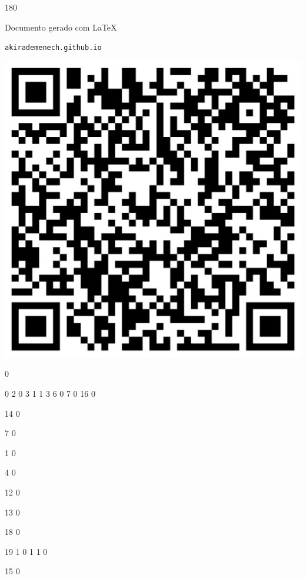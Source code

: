 \documentclass[12pt]{article}
\begin{document}
	\begin{turn}{180}	
		\begin{minipage}{\textwidth}		  
		  Documento gerado com \LaTeX			
		  
		  \texttt{akirademenech.github.io}

		  \includegraphics[height=0.3\textheight]{2e-2.pdf}

		\end{minipage}	
	\end{turn}  
		  
		\vfill  
		  
{
	0	%

	0	%
	2	%
	0	%
	3	%
	1	%
	1	%
	3	%
	6	%
	0	%
	7	%
	0	%
	16	%
	0	%

	14	%
	0	%

	7	%
	0	%

	1	%
	0	%

	4	%
	0	%

	12	%
	0	%

	13	%
	0	%

	18	%
	0	%

	19	%
	1	%
	0	%
	1	%
	1	%
	0	%

	15	%
	0	%

}	  
		    	
\end{document}

